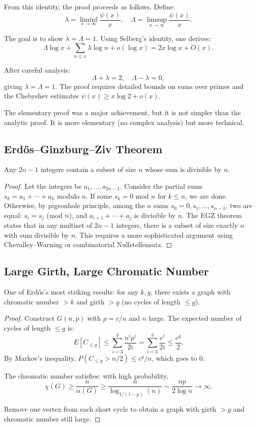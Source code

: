From this identity, the proof proceeds as follows. Define:
\[
\lambda = \liminf_{x \to \infty} \frac{\psi(x)}{x}, \quad \Lambda = \limsup_{x \to \infty} \frac{\psi(x)}{x}.
\]

The goal is to show $\lambda = \Lambda = 1$. Using Selberg's identity, one derives:
\[
\Lambda \log x + \sum_{n \leq x} \lambda \log n + o(\log x) = 2x \log x + O(x).
\]

After careful analysis:
\[
\Lambda + \lambda = 2, \quad \Lambda - \lambda = 0,
\]
giving $\lambda = \Lambda = 1$. The proof requires detailed bounds on sums over primes and the Chebyshev estimates $\psi(x) \geq x \log 2 + o(x)$.

The elementary proof was a major achievement, but it is not simpler than the analytic proof. It is more elementary (no complex analysis) but more technical.

\subsection{Erd\H{o}s--Ginzburg--Ziv Theorem}

\begin{theorem}
Any $2n-1$ integers contain a subset of size $n$ whose sum is divisible by $n$.
\end{theorem}

\begin{proof}
Let the integers be $a_1, \ldots, a_{2n-1}$. Consider the partial sums $s_k = a_1 + \cdots + a_k$ modulo $n$. If some $s_k = 0$ mod $n$ for $k \leq n$, we are done. Otherwise, by pigeonhole principle, among the $n$ sums $s_0 = 0, s_1, \ldots, s_{n-1}$, two are equal: $s_i = s_j$ (mod $n$), and $a_{i+1} + \cdots + a_j$ is divisible by $n$. The EGZ theorem states that in any multiset of $2n-1$ integers, there is a subset of size exactly $n$ with sum divisible by $n$. This requires a more sophisticated argument using Chevalley--Warning or combinatorial Nullstellensatz.
\end{proof}

\subsection{Large Girth, Large Chromatic Number}

One of Erd\H{o}s's most striking results: for any $k, g$, there exists a graph with chromatic number $> k$ and girth $> g$ (no cycles of length $\leq g$).

\begin{proof}
Construct $G(n,p)$ with $p = c/n$ and $n$ large. The expected number of cycles of length $\leq g$ is:
\[
E[C_{\leq g}] \leq \sum_{i=3}^g \frac{n^i p^i}{2i} = \sum_{i=3}^g \frac{c^i}{2i} \leq \frac{c^g}{2}.
\]
By Markov's inequality, $P(C_{\leq g} > n/2) \leq c^g/n$, which goes to 0.

The chromatic number satisfies: with high probability,
\[
\chi(G) \geq \frac{n}{\alpha(G)} \geq \frac{n}{\log_{1/(1-p)}(n)} \sim \frac{np}{2\log n} \to \infty.
\]

Remove one vertex from each short cycle to obtain a graph with girth $> g$ and chromatic number still large. \end{proof}

